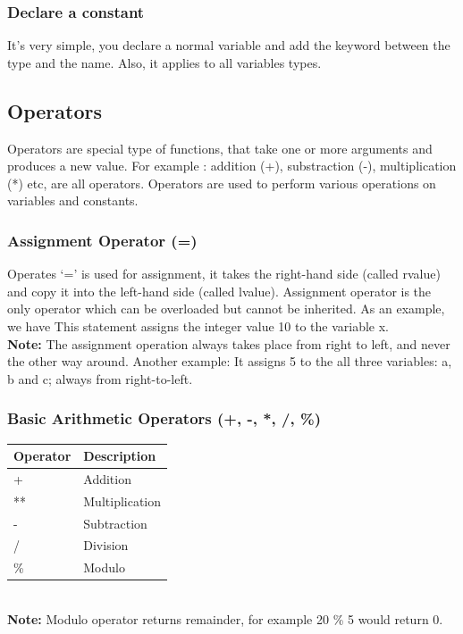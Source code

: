 \documentclass[11pt, a4paper]{article}
\begin{document}
\subsubsection{Declare a constant}
It’s very simple, you declare a normal variable and add the keyword  between the type
and the name. Also, it applies to all variables types.


\subsection{Operators}
Operators are special type of functions, that take one or more arguments
and produces a new value. For example : addition (+), substraction (-),
multiplication (*) etc, are all operators. Operators are used to perform
various operations on variables and constants.

\subsubsection{Assignment Operator (=)}
Operates `=' is used for assignment, it takes the right-hand side (called rvalue)
and copy it into the left-hand side (called lvalue). Assignment operator is the
only operator which can be overloaded but cannot be inherited. As an example, we have
 This statement assigns the integer value 10 to the variable x.\\
\textbf{Note:} The assignment operation always takes place from right to left,
and never the other way around. Another example: 
It assigns 5 to the all three variables: a, b and c; always from right-to-left.

\subsubsection{Basic Arithmetic Operators (+, -, *, /, \%)}

\begin{tabular}{ |p{3cm}||p{5cm}| }
    \hline
    \textbf{Operator} & \textbf{Description} \\
    \hline
    +  & Addition    \\
    ** &   Multiplication  \\
    -  & Subtraction \\
    / & Division \\
    \%    &Modulo\\
    \hline
\end{tabular}\\
\newline\textbf{Note:} Modulo operator returns remainder, for example 20 \% 5 would return 0.

\end{document}
